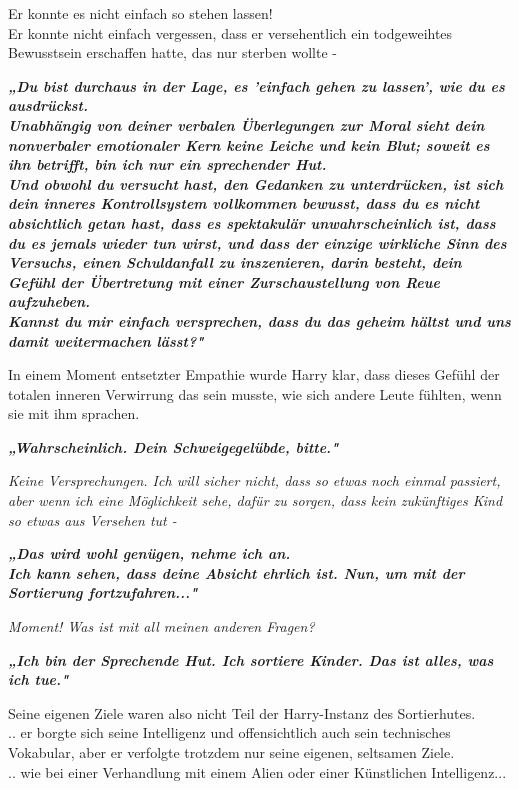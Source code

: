 {Er konnte es nicht einfach so stehen lassen!\\ Er konnte nicht einfach vergessen, dass er versehentlich ein todgeweihtes Bewusstsein erschaffen hatte, das nur sterben wollte -

\textbf{\emph{„Du bist durchaus in der Lage, es 'einfach gehen zu lassen', wie du es ausdrückst.\\ Unabhängig von deiner verbalen Überlegungen zur Moral sieht dein nonverbaler emotionaler Kern keine Leiche und kein Blut; soweit es ihn betrifft, bin ich nur ein sprechender Hut.\\ Und obwohl du versucht hast, den Gedanken zu unterdrücken, ist sich dein inneres Kontrollsystem vollkommen bewusst, dass du es nicht absichtlich getan hast, dass es spektakulär unwahrscheinlich ist, dass du es jemals wieder tun wirst, und dass der einzige wirkliche Sinn des Versuchs, einen Schuldanfall zu inszenieren, darin besteht, dein Gefühl der Übertretung mit einer Zurschaustellung von Reue aufzuheben.\\ Kannst du mir einfach versprechen, dass du das geheim hältst und uns damit weitermachen lässt?"}}

In einem Moment entsetzter Empathie wurde Harry klar, dass dieses Gefühl der totalen inneren Verwirrung das sein musste, wie sich andere Leute fühlten, wenn sie mit ihm sprachen.

\textbf{\emph{„Wahrscheinlich. Dein Schweigegelübde, bitte."}}

\emph{Keine Versprechungen. Ich will sicher nicht, dass so etwas noch einmal passiert, aber wenn ich eine Möglichkeit sehe, dafür zu sorgen, dass kein zukünftiges Kind so etwas aus Versehen tut -}

\textbf{\emph{„Das wird wohl genügen, nehme ich an.\\ Ich kann sehen, dass deine Absicht ehrlich ist. Nun, um mit der Sortierung fortzufahren..."}}

\emph{Moment! Was ist mit all meinen anderen Fragen?}

\textbf{\emph{„Ich bin der Sprechende Hut. Ich sortiere Kinder. Das ist alles, was ich tue."}}

Seine eigenen Ziele waren also nicht Teil der Harry-Instanz des Sortierhutes.\\ .. er borgte sich seine Intelligenz und offensichtlich auch sein technisches Vokabular, aber er verfolgte trotzdem nur seine eigenen, seltsamen Ziele.\\ .. wie bei einer Verhandlung mit einem Alien oder einer Künstlichen Intelligenz...

}
